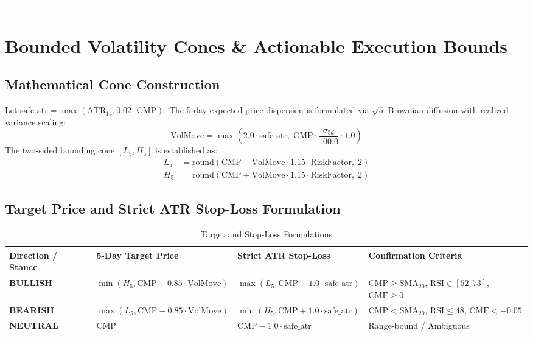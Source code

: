 \documentclass[11pt,a4paper]{article}
\begin{document}
---

\section{Bounded Volatility Cones \& Actionable Execution Bounds}

\subsection{Mathematical Cone Construction}
Let $\text{safe\_atr} = \max(\text{ATR}_{14}, 0.02 \cdot \text{CMP})$. The 5-day expected price dispersion is formulated via $\sqrt{5}$ Brownian diffusion with realized variance scaling:
\begin{equation}
\text{VolMove} = \max\left(2.0 \cdot \text{safe\_atr},\; \text{CMP} \cdot \frac{\sigma_{5d}}{100.0} \cdot 1.0\right)
\end{equation}
The two-sided bounding cone $[L_5, H_5]$ is established as:
\begin{align}
L_5 &= \text{round}\left(\text{CMP} - \text{VolMove} \cdot 1.15 \cdot \text{RiskFactor},\; 2\right) \\
H_5 &= \text{round}\left(\text{CMP} + \text{VolMove} \cdot 1.15 \cdot \text{RiskFactor},\; 2\right)
\end{align}

\subsection{Target Price and Strict ATR Stop-Loss Formulation}
\begin{table}[h!]
\centering
\small
\begin{tabularx}{\textwidth}{lXXX}
\toprule
\textbf{Direction / Stance} & \textbf{5-Day Target Price} & \textbf{Strict ATR Stop-Loss} & \textbf{Confirmation Criteria} \\
\midrule
\textbf{BULLISH} & $\min(H_5, \text{CMP} + 0.85 \cdot \text{VolMove})$ & $\max(L_5, \text{CMP} - 1.0 \cdot \text{safe\_atr})$ & $\text{CMP} \ge \text{SMA}_{20}$, $\text{RSI} \in [52, 73]$, $\text{CMF} \ge 0$ \\
\textbf{BEARISH} & $\max(L_5, \text{CMP} - 0.85 \cdot \text{VolMove})$ & $\min(H_5, \text{CMP} + 1.0 \cdot \text{safe\_atr})$ & $\text{CMP} < \text{SMA}_{20}$, $\text{RSI} \le 48$, $\text{CMF} < -0.05$ \\
\textbf{NEUTRAL} & $\text{CMP}$ & $\text{CMP} - 1.0 \cdot \text{safe\_atr}$ & Range-bound / Ambiguous \\
\bottomrule
\end{tabularx}
\caption{Target and Stop-Loss Formulations}
\end{table}
\end{document}
